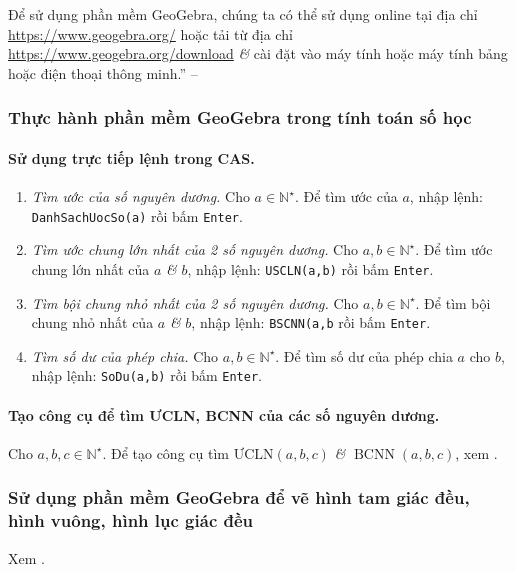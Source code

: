 \documentclass{article}
\numberwithin{equation}{section}
\begin{document}
Để sử dụng phần mềm GeoGebra, chúng ta có thể sử dụng online tại địa chỉ \url{https://www.geogebra.org/} hoặc tải từ địa chỉ \url{https://www.geogebra.org/download} \textit{\&} cài đặt vào máy tính hoặc máy tính bảng hoặc điện thoại thông minh.'' -- \cite[p. 119]{Thai_Anh_Dat_Ha_Loan_Nam_Quang_Toan_6_tap_1}

\subsubsection{Thực hành phần mềm GeoGebra trong tính toán số học}

\paragraph{Sử dụng trực tiếp lệnh trong CAS.}
\begin{enumerate}
	\item \textit{Tìm ước của số nguyên dương.} Cho $a\in\mathbb{N}^\star$. Để tìm ước của $a$, nhập lệnh: \texttt{DanhSachUocSo(a)} rồi bấm \texttt{Enter}.
	\item \textit{Tìm ước chung lớn nhất của 2 số nguyên dương.} Cho $a,b\in\mathbb{N}^\star$. Để tìm ước chung lớn nhất của $a$ \textit{\&} $b$, nhập lệnh: \texttt{USCLN(a,b)} rồi bấm \texttt{Enter}.
	\item \textit{Tìm bội chung nhỏ nhất của 2 số nguyên dương.} Cho $a,b\in\mathbb{N}^\star$. Để tìm bội chung nhỏ nhất của $a$ \textit{\&} $b$, nhập lệnh: \texttt{BSCNN(a,b} rồi bấm \texttt{Enter}.
	\item \textit{Tìm số dư của phép chia.} Cho $a,b\in\mathbb{N}^\star$. Để tìm số dư của phép chia $a$ cho $b$, nhập lệnh: \texttt{SoDu(a,b)} rồi bấm \texttt{Enter}.
\end{enumerate}

\paragraph{Tạo công cụ để tìm ƯCLN, BCNN của các số nguyên dương.} Cho $a,b,c\in\mathbb{N}^\star$. Để tạo công cụ tìm $\mbox{ƯCLN}(a,b,c)$ \textit{\&} $\operatorname{BCNN}(a,b,c)$, xem \cite[pp. 120--121]{Thai_Anh_Dat_Ha_Loan_Nam_Quang_Toan_6_tap_1}.

\subsubsection{Sử dụng phần mềm GeoGebra để vẽ hình tam giác đều, hình vuông, hình lục giác đều}
Xem \cite[pp. 122--124]{Thai_Anh_Dat_Ha_Loan_Nam_Quang_Toan_6_tap_1}.
\end{document}
